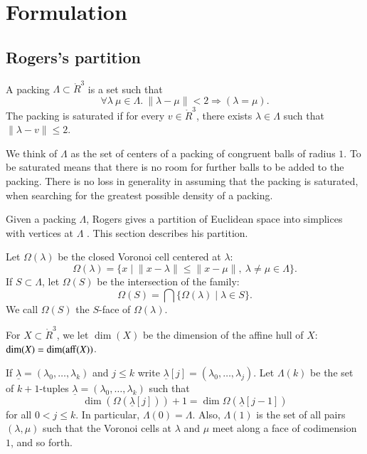 
\def\lam{\lambda}
\def\Lam{\Lambda}
\def\bl{{\underline{\lam}}}
\def\bm{{\underline{\mu}}}
\def\norm#1{{\|#1\|}}
\def\angle#1#2#3{{\op{angle}(#1,{#2,#3})}}

\chapter{Formulation}

\section{Rogers's partition}

\begin{definition}
A packing $\Lam\subset \ring{R}^3$ is a set such that
$$\forall \lam~\mu\in \Lam.~  \norm{\lam-\mu} < 2 \Rightarrow (\lam=\mu).$$
The packing is saturated if for every $v\in\ring{R}^3$,   there exists $\lam\in\Lam$
such that $\norm{\lam-v}\le 2$.
\end{definition}

We think of $\Lam$ as the set of centers of a  packing of congruent balls of radius $1$.
To be saturated means that there is no room for further balls to be added to the packing.
There is no loss in generality in assuming that the packing is saturated, when searching
for the greatest possible density of a packing.

Given a packing $\Lam$, Rogers gives a partition of Euclidean space into
simplices with vertices at $\Lam$ \cite{Rog58}.   This section describes his partition.

Let $\Omega(\lam)$  be the closed Voronoi cell centered at $\lam$:
$$
  \Omega(\lam) = \{x \mid  \norm{x-\lam} \le \norm{x-\mu},\ \lam\ne\mu\in\Lam\}.
$$
If $S\subset\Lam$, let $\Omega(S)$ be the intersection of the family:
$$\Omega(S)  = \bigcap \{\Omega(\lam)\mid \lam\in S \}.$$
We call $\Omega(S)$ the $S$-face of $\Omega(\lam)$.

For $X\subset\ring{R}^3$, we let $\dim(X)$ be the dimension of the affine hull
of $X$: $\dim(X) = \dim({\operatorname{aff}}(X))$.

If $\bl=(\lam_0,\ldots,\lam_k)$ and $j\le k$ write $\bl[j] = (\lam_0,\ldots,\lam_j)$.
Let $\Lam(k)$ be the set of $k+1$-tuples $\bl=(\lam_0,\ldots,\lam_k)$ such
that 
\begin{equation}\label{eqn:omega-dim}
\dim(\Omega(\bl[j]))+1 = \dim\Omega(\bl[j-1])
\end{equation}
for all $0<j\le k$.
In particular, $\Lam(0)=\Lam$.  Also, $\Lam(1)$ is the
set of all pairs $(\lam,\mu)$ such that the Voronoi cells at $\lam$ and $\mu$ meet along
a face of codimension $1$, and
so forth.


